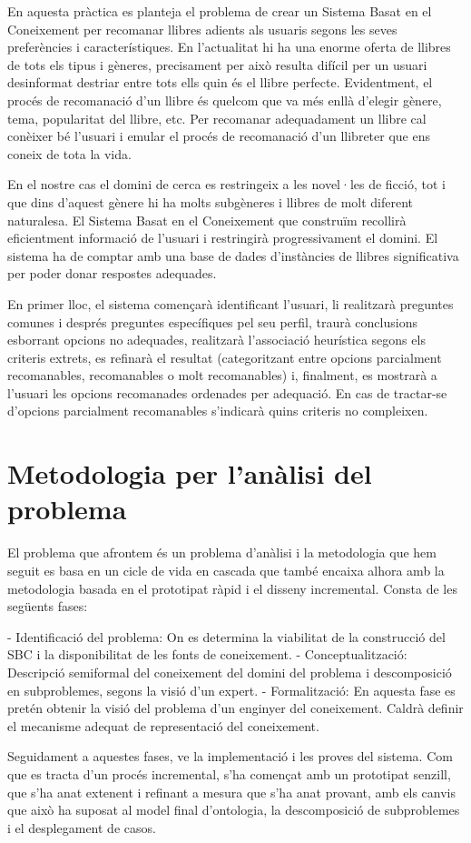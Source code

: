 
En aquesta pràctica es planteja el problema de crear un Sistema Basat en el Coneixement per recomanar llibres adients als usuaris segons les seves preferències i característiques. En l'actualitat hi ha una enorme oferta de llibres de tots els tipus i gèneres, precisament per això resulta difícil per un usuari desinformat destriar entre tots ells quin és el llibre perfecte. Evidentment, el procés de recomanació d'un llibre és quelcom que va més enllà d'elegir gènere, tema, popularitat del llibre, etc. Per recomanar adequadament un llibre cal conèixer bé l'usuari i emular el procés de recomanació d'un llibreter que ens coneix de tota la vida.

En el nostre cas el domini de cerca es restringeix a les novel·les de ficció, tot i que dins d'aquest gènere hi ha molts subgèneres i llibres de molt diferent naturalesa. El Sistema Basat en el Coneixement que construïm recollirà eficientment informació de l'usuari i restringirà progressivament el domini. El sistema ha de comptar amb una base de dades d'instàncies de llibres significativa per poder donar respostes adequades.

En primer lloc, el sistema començarà identificant l'usuari, li realitzarà preguntes comunes i després preguntes específiques pel seu perfil, traurà conclusions esborrant opcions no adequades, realitzarà l'associació heurística segons els criteris extrets, es refinarà el resultat (categoritzant entre opcions parcialment recomanables, recomanables o molt recomanables) i, finalment, es mostrarà a l'usuari les opcions recomanades ordenades per adequació. En cas de tractar-se d'opcions parcialment recomanables s'indicarà quins criteris no compleixen.

\section{Metodologia per l'anàlisi del problema}

El problema que afrontem és un problema d'anàlisi i la metodologia que hem seguit es basa en un cicle de vida en cascada que també encaixa alhora amb la metodologia basada en el prototipat ràpid i el disseny incremental. Consta de les següents fases:

- Identificació del problema: On es determina la viabilitat de la construcció del SBC i la disponibilitat de les fonts de coneixement.
- Conceptualització: Descripció semiformal del coneixement del domini del problema i descomposició en subproblemes, segons la visió d'un expert.
- Formalització: En aquesta fase es pretén obtenir la visió del problema d'un enginyer del coneixement. Caldrà definir el mecanisme adequat de representació del coneixement.

Seguidament a aquestes fases, ve la implementació i les proves del sistema. Com que es tracta d'un procés incremental, s'ha començat amb un prototipat senzill, que s'ha anat extenent i refinant a mesura que s'ha anat provant, amb els canvis que això ha suposat al model final d'ontologia, la descomposició de subproblemes i el desplegament de casos.